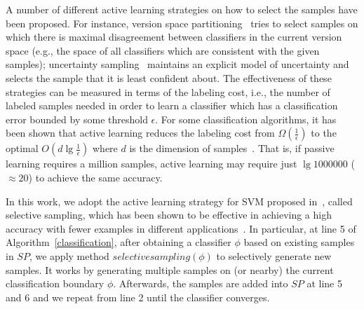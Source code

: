 A number of different active learning strategies on how to select the samples have been proposed. For instance, version space partitioning~\cite{DBLP:conf/icml/RuffD89} tries to select samples on which there is maximal disagreement between classifiers in the current version space (e.g., the space of all classifiers which are consistent with the given samples); uncertainty sampling~\cite{DBLP:conf/sigir/LewisG94} maintains an explicit model of uncertainty and selects the sample that it is least confident about. The effectiveness of these strategies can be measured in terms of the labeling cost, i.e., the number of labeled samples needed in order to learn a classifier which has a classification error bounded by some threshold $\epsilon$. For some classification algorithms, it has been shown that active learning reduces the labeling cost from $\Omega(\frac{1}{\epsilon})$ to the optimal $O(d\lg\frac{1}{\epsilon})$ where $d$ is the dimension of samples~\cite{DBLP:conf/nips/Gilad-BachrachNT05,DBLP:conf/nips/Dasgupta05}. That is, if passive learning requires a million samples, active learning may require just $\lg 1000000$ ($\approx 20$) to achieve the same accuracy.

In this work, we adopt the active learning strategy for SVM proposed in~\cite{DBLP:conf/icml/SchohnC00}, called selective sampling, which has been shown to be effective in achieving a high accuracy with fewer examples in different applications~\cite{DBLP:conf/mm/TongC01,DBLP:journals/jmlr/TongK01}. In particular,
at line 5 of Algorithm~\ref{classification}, after obtaining a classifier $\phi$ based on existing samples in $SP$, we apply method $selectivesampling(\phi)$ to selectively generate new samples. It works by generating multiple samples on (or nearby) the current classification boundary $\phi$. Afterwards, the samples are added into $SP$ at line 5 and 6 and we repeat from line 2 until the classifier converges.
%

